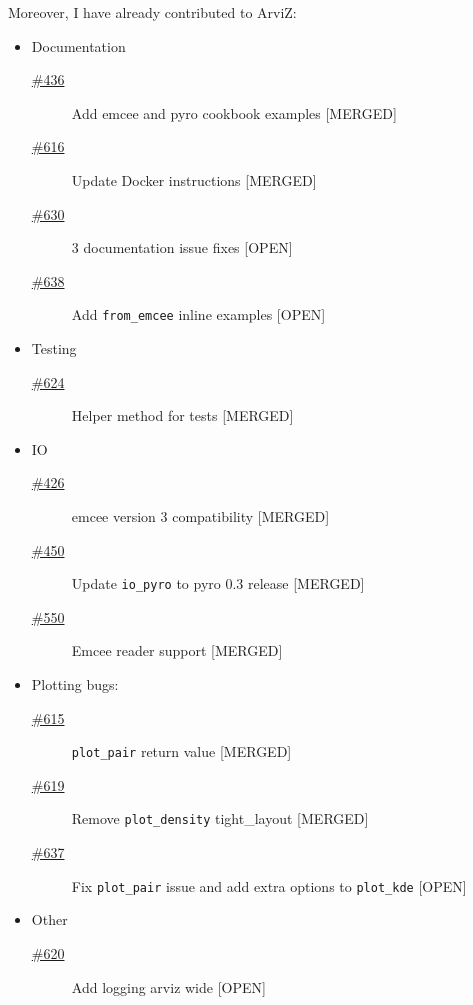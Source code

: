 \documentclass{article}
\begin{document}
\noindent Moreover, I have already contributed to ArviZ:

\begin{itemize}
\item Documentation
  \begin{description}
    \item[\href{https://github.com/arviz-devs/arviz/pull/436}{\#436}] Add emcee
    and pyro cookbook examples {[}MERGED{]}
    \item[\href{https://github.com/arviz-devs/arviz/pull/616}{\#616}] Update
    Docker instructions {[}MERGED{]}
    \item[\href{https://github.com/arviz-devs/arviz/pull/630}{\#630}] 3
      documentation issue fixes {[}OPEN{]}
    \item[\href{https://github.com/arviz-devs/arviz/pull/638}{\#638}] Add
        \texttt{from\_emcee} inline examples {[}OPEN{]}
  \end{description}
\item Testing
  \begin{description}
    \item[\href{https://github.com/arviz-devs/arviz/pull/624}{\#624}] Helper
    method for tests {[}MERGED{]}
  \end{description}
\item IO
\begin{description}
  \item[\href{https://github.com/arviz-devs/arviz/pull/426}{\#426}] emcee
  version 3 compatibility {[}MERGED{]}
  \item[\href{https://github.com/arviz-devs/arviz/pull/450}{\#450}] Update
    \texttt{io\_pyro} to pyro 0.3 release {[}MERGED{]}
  \item[\href{https://github.com/arviz-devs/arviz/pull/550}{\#550}] Emcee
      reader support {[}MERGED{]}
\end{description}
\item Plotting bugs:
\begin{description}
  \item[\href{https://github.com/arviz-devs/arviz/pull/615}{\#615}] \texttt{plot\_pair} return value {[}MERGED{]}
  \item[\href{https://github.com/arviz-devs/arviz/pull/619}{\#619}] Remove
    \texttt{plot\_density} tight\_layout {[}MERGED{]}
  \item[\href{https://github.com/arviz-devs/arviz/pull/637}{\#637}] Fix
    \texttt{plot\_pair} issue and add extra options to \texttt{plot\_kde}
    {[}OPEN{]}
\end{description}
\item Other
\begin{description}
  \item[\href{https://github.com/arviz-devs/arviz/pull/620}{\#620}] Add
  logging arviz wide {[}OPEN{]}
\end{description}
\end{itemize}
\end{document}
